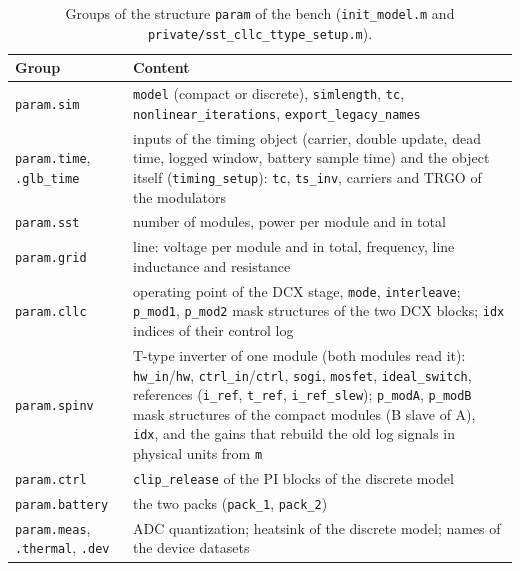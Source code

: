 \documentclass[12pt,a4paper]{scrartcl}
\begin{document}
\begin{onehalfspace}
\begin{table}[H]
	\centering
	\captionsetup{width=0.9\textwidth, font=small}
	\caption[Groups of the structure \texttt{param} of the bench.]{Groups of the structure \texttt{param} of the bench (\texttt{init\_model.m} and \texttt{private/sst\_cllc\_ttype\_setup.m}).}
	\label{tab:param2026}
	\small
	\begin{tabularx}{0.97\textwidth}{@{} l X @{}}
		\toprule
		\textbf{Group} & \textbf{Content} \\
		\midrule
		\texttt{param.sim} & \texttt{model} (compact or discrete), \texttt{simlength}, \texttt{tc}, \texttt{nonlinear\_iterations}, \texttt{export\_legacy\_names} \\
		\texttt{param.time}, \texttt{.glb\_time} & inputs of the timing object (carrier, double update, dead time, logged window, battery sample time) and the object itself (\texttt{timing\_setup}): \texttt{tc}, \texttt{ts\_inv}, carriers and TRGO of the modulators \\
		\texttt{param.sst} & number of modules, power per module and in total \\
		\texttt{param.grid} & line: voltage per module and in total, frequency, line inductance and resistance \\
		\texttt{param.cllc} & operating point of the DCX stage, \texttt{mode}, \texttt{interleave}; \texttt{p\_mod1}, \texttt{p\_mod2} mask structures of the two DCX blocks; \texttt{idx} indices of their control log \\
		\texttt{param.spinv} & T-type inverter of one module (both modules read it): \texttt{hw\_in}/\texttt{hw}, \texttt{ctrl\_in}/\texttt{ctrl}, \texttt{sogi}, \texttt{mosfet}, \texttt{ideal\_switch}, references (\texttt{i\_ref}, \texttt{t\_ref}, \texttt{i\_ref\_slew}); \texttt{p\_modA}, \texttt{p\_modB} mask structures of the compact modules (B slave of A), \texttt{idx}, and the gains that rebuild the old log signals in physical units from \texttt{m} \\
		\texttt{param.ctrl} & \texttt{clip\_release} of the PI blocks of the discrete model \\
		\texttt{param.battery} & the two packs (\texttt{pack\_1}, \texttt{pack\_2}) \\
		\texttt{param.meas}, \texttt{.thermal}, \texttt{.dev} & ADC quantization; heatsink of the discrete model; names of the device datasets \\
		\bottomrule
	\end{tabularx}
\end{table}


\end{onehalfspace}
\end{document}
